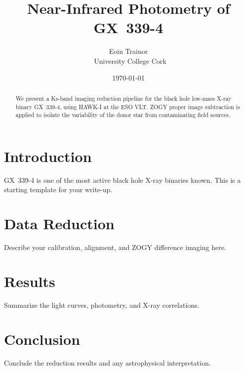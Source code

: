 \documentclass[12pt,a4paper]{article}
\title{Near-Infrared Photometry of GX~339-4}
\author{Eoin Trainor \\\ University College Cork}
\date{\today}
\begin{document}
\maketitle

\begin{abstract}
We present a Ks-band imaging reduction pipeline for the black hole
low-mass X-ray binary GX~339-4, using HAWK-I at the ESO VLT.
ZOGY proper image subtraction is applied to isolate the variability
of the donor star from contaminating field sources.
\end{abstract}

\section{Introduction}

GX~339-4 is one of the most active black hole X-ray binaries known.
This is a starting template for your write-up.

\section{Data Reduction}

Describe your calibration, alignment, and ZOGY difference imaging here.

\section{Results}

Summarize the light curves, photometry, and X-ray correlations.

\section{Conclusion}

Conclude the reduction results and any astrophysical interpretation.
\end{document}
